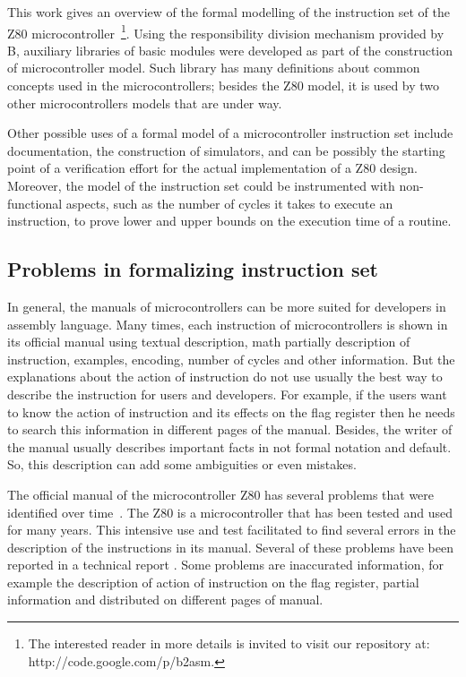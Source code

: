 \documentclass[11pt]{article} %
\begin{document}
This work gives an overview of the formal modelling of the instruction
set of the Z80 microcontroller~\cite{Z80_manual}\footnote{The
  interested reader in more details is invited to visit our repository
  at: http://code.google.com/p/b2asm.}. Using the responsibility
division mechanism provided by B, auxiliary libraries of basic modules
were developed as part of the construction of microcontroller
model. Such library has many definitions about common concepts used in
the microcontrollers; besides the Z80 model, it is used by two other
microcontrollers models that are under way.

Other possible uses of a formal model of a microcontroller
instruction set include documentation, the construction of simulators,
and can be possibly the starting point of a verification effort for the
actual implementation of a Z80 design. Moreover, the model of the
instruction set could be instrumented with non-functional aspects,
such as the number of cycles it takes to execute an instruction, to
prove lower and upper bounds on the execution time of a routine. 


\subsection{Problems in formalizing instruction set}

In general, the manuals of microcontrollers can be more suited for
developers in assembly language. Many times, each instruction of microcontrollers
is shown in its official manual using textual description, math partially
description of instruction, examples, encoding, number of cycles and other
information. But the explanations about the action of instruction do not use
usually the best way to describe the instruction for users and developers. For
example, if the users want to know the action of instruction and its effects on
the flag register then he needs to search this information in different pages of
the manual. Besides, the writer of the manual usually describes important facts
in not formal notation and default. So, this description can add some
ambiguities or even mistakes. 


The official manual of the microcontroller Z80 \cite{Z80_manual} has several
problems that were identified over time~\cite{UndocumentedZ80}. The Z80 is a
microcontroller that  has been tested and used for many years. This intensive use
and test facilitated to find several errors in the description of the
instructions in its manual. Several of these problems have been reported in a
technical report \cite{UndocumentedZ80}. Some problems are inaccurated
information, for example the description of action of instruction on the flag
register, partial information and distributed on different pages of manual.
\end{document}
